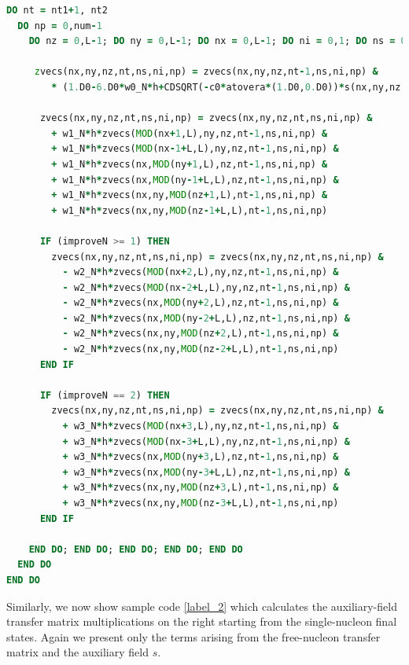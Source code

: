 \begin{lstlisting}[language=Fortran,caption=Sample code calculating 
the auxiliary-field transfer matrix multiplications on the left starting from the single-nucleon initial states,label={label_1}]
DO nt = nt1+1, nt2     
  DO np = 0,num-1        
    DO nz = 0,L-1; DO ny = 0,L-1; DO nx = 0,L-1; DO ni = 0,1; DO ns = 0,1
              
     zvecs(nx,ny,nz,nt,ns,ni,np) = zvecs(nx,ny,nz,nt-1,ns,ni,np) &
        * (1.D0-6.D0*w0_N*h+CDSQRT(-c0*atovera*(1.D0,0.D0))*s(nx,ny,nz,nt-1))
              
      zvecs(nx,ny,nz,nt,ns,ni,np) = zvecs(nx,ny,nz,nt,ns,ni,np) &
        + w1_N*h*zvecs(MOD(nx+1,L),ny,nz,nt-1,ns,ni,np) &
        + w1_N*h*zvecs(MOD(nx-1+L,L),ny,nz,nt-1,ns,ni,np) &
        + w1_N*h*zvecs(nx,MOD(ny+1,L),nz,nt-1,ns,ni,np) &
        + w1_N*h*zvecs(nx,MOD(ny-1+L,L),nz,nt-1,ns,ni,np) &
        + w1_N*h*zvecs(nx,ny,MOD(nz+1,L),nt-1,ns,ni,np) &
        + w1_N*h*zvecs(nx,ny,MOD(nz-1+L,L),nt-1,ns,ni,np)
              
      IF (improveN >= 1) THEN                 
        zvecs(nx,ny,nz,nt,ns,ni,np) = zvecs(nx,ny,nz,nt,ns,ni,np) & 
          - w2_N*h*zvecs(MOD(nx+2,L),ny,nz,nt-1,ns,ni,np) &
          - w2_N*h*zvecs(MOD(nx-2+L,L),ny,nz,nt-1,ns,ni,np) &
          - w2_N*h*zvecs(nx,MOD(ny+2,L),nz,nt-1,ns,ni,np) &
          - w2_N*h*zvecs(nx,MOD(ny-2+L,L),nz,nt-1,ns,ni,np) &
          - w2_N*h*zvecs(nx,ny,MOD(nz+2,L),nt-1,ns,ni,np) &
          - w2_N*h*zvecs(nx,ny,MOD(nz-2+L,L),nt-1,ns,ni,np)
      END IF
              
      IF (improveN == 2) THEN
        zvecs(nx,ny,nz,nt,ns,ni,np) = zvecs(nx,ny,nz,nt,ns,ni,np) &
          + w3_N*h*zvecs(MOD(nx+3,L),ny,nz,nt-1,ns,ni,np) &
          + w3_N*h*zvecs(MOD(nx-3+L,L),ny,nz,nt-1,ns,ni,np) &
          + w3_N*h*zvecs(nx,MOD(ny+3,L),nz,nt-1,ns,ni,np) &
          + w3_N*h*zvecs(nx,MOD(ny-3+L,L),nz,nt-1,ns,ni,np) &           
          + w3_N*h*zvecs(nx,ny,MOD(nz+3,L),nt-1,ns,ni,np) &
          + w3_N*h*zvecs(nx,ny,MOD(nz-3+L,L),nt-1,ns,ni,np)
      END IF
              
    END DO; END DO; END DO; END DO; END DO
  END DO
END DO

\end{lstlisting}


Similarly, we now show sample code \ref{label_2} which calculates 
the auxiliary-field transfer matrix multiplications on the right starting from 
the single-nucleon final states.  Again we present only the terms arising from the free-nucleon transfer matrix and the auxiliary field $s$.  

